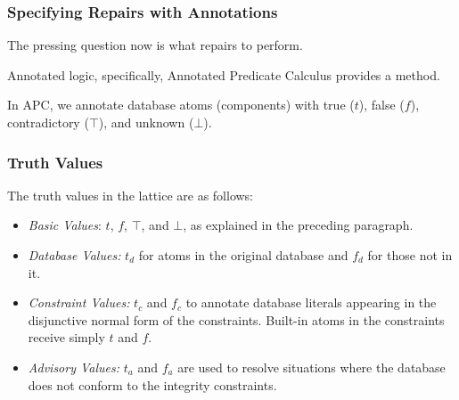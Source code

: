 \begin{frame}
\frametitle{Specifying Repairs with Annotations}

The pressing question now is what repairs to perform. 

Annotated logic, specifically, \alert{Annotated Predicate Calculus} provides a method.

In APC, we annotate database atoms (components) with true ($t$), false ($f$), contradictory ($\top$), and unknown ($\bot$).


\end{frame}

\begin{frame}
\frametitle{Truth Values}

The truth values in the lattice are as follows:

\begin{itemize}
\item \textit{Basic Values}: $t$, $f$, $\top$, and $\bot$, as explained in the preceding paragraph. 
\item \textit{Database Values:} $t_d$ for atoms in the original database and $f_d$ for those not in it.
\item \textit{Constraint Values:} $t_c$ and $f_c$ to annotate database literals appearing in the disjunctive normal form of the constraints. Built-in atoms in the constraints receive simply $t$ and $f$.
\item \textit{Advisory Values:} $t_a$ and $f_a$ are used to resolve situations where the database does not conform to the integrity constraints. 
\end{itemize}



\end{frame}

